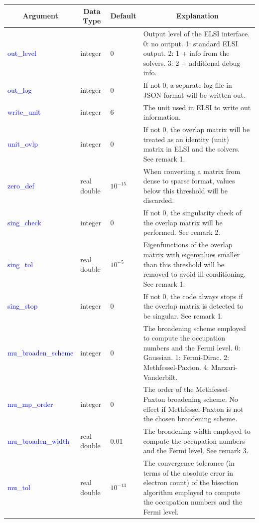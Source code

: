 \documentclass{report}
\begin{document}
\begin{tabular}[]{|p{30mm}|p{20mm}|p{15mm}|p{100mm}|}
\hline
\multicolumn{1}{|c|}{\textbf{Argument}} & \multicolumn{1}{c|}{\textbf{Data Type}} & \multicolumn{1}{c|}{\textbf{Default}} & \multicolumn{1}{c|}{\textbf{Explanation}}\\
\hline
\textcolor{blue}{out\_level}          & integer            & 0          & Output level of the ELSI interface.  0: no output.  1:  standard ELSI output.  2:  1 + info from the solvers.  3:  2 + additional debug info.\\
\hline
\textcolor{blue}{out\_log}            & integer            & 0          & If not 0, a separate log file in JSON format will be written out.\\
\hline
\textcolor{blue}{write\_unit}         & integer            & 6          & The unit used in ELSI to write out information.\\
\hline
\textcolor{blue}{unit\_ovlp }         & integer            & 0          & If not 0, the overlap matrix will be treated as an identity (unit) matrix in ELSI and the solvers.  See remark 1.\\
\hline
\textcolor{blue}{zero\_def }          & real double        & $10^{-15}$ & When converting a matrix from dense to sparse format, values below this threshold will be discarded.\\
\hline
\textcolor{blue}{sing\_check}         & integer            & 0          & If not 0, the singularity check of the overlap matrix will be performed.  See remark 2.\\
\hline
\textcolor{blue}{sing\_tol}           & real double        & $10^{-5}$  & Eigenfunctions of the overlap matrix with eigenvalues smaller than this threshold will be removed to avoid ill-conditioning.  See remark 1.\\
\hline
\textcolor{blue}{sing\_stop}          & integer            & 0          & If not 0, the code always stops if the overlap matrix is detected to be singular.  See remark 1.\\
\hline
\textcolor{blue}{mu\_broaden\_scheme} & integer            & 0          & The broadening scheme employed to compute the occupation numbers and the Fermi level.  0:  Gaussian.  1:  Fermi-Dirac.  2:  Methfessel-Paxton.  4:  Marzari-Vanderbilt.\\
\hline
\textcolor{blue}{mu\_mp\_order}       & integer            & 0          & The order of the Methfessel-Paxton broadening scheme.  No effect if Methfessel-Paxton is not the chosen broadening scheme.\\
\hline
\textcolor{blue}{mu\_broaden\_width}  & real double        & 0.01       & The broadening width employed to compute the occupation numbers and the Fermi level.  See remark 3.\\
\hline
\textcolor{blue}{mu\_tol}             & real double        & $10^{-13}$ & The convergence tolerance (in terms of the absolute error in electron count) of the bisection algorithm employed to compute the occupation numbers and the Fermi level.\\
\hline
\end{tabular}
\end{document}
